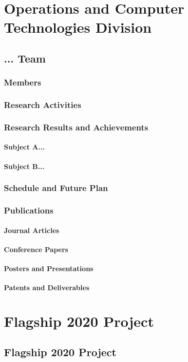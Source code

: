 \documentclass{book}
\begin{document}
\part{Operations and Computer Technologies Division}

\chapter{... Team}

\section{Members}

\section{Research Activities}

\section{Research Results and Achievements}

\subsection{Subject A...}

\subsection{Subject B...}

\section{Schedule and Future Plan}

\section{Publications}

\subsection{Journal Articles}

\subsection{Conference Papers}


\subsection{Posters and Presentations}


\subsection{Patents and Deliverables}



\part{Flagship 2020 Project}


\chapter{Flagship 2020 Project}
\end{document}
